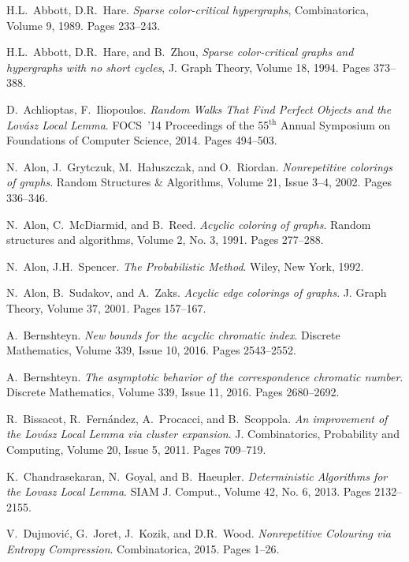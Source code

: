 \documentclass[10pt]{article}
\numberwithin{equation}{subsection}
\theoremstyle{definition}
\begin{document}
	\begin{thebibliography}{99}\setlength{\itemsep}{-0.001mm}
		
		 H.L.~Abbott, D.R.~Hare. \emph{Sparse color-critical hypergraphs}, Combinatorica, Volume 9, 1989. Pages 233--243.
		
		 H.L.~Abbott, D.R.~Hare, and B.~Zhou, \emph{Sparse color-critical graphs and hypergraphs
		with no short cycles}, J. Graph Theory, Volume 18, 1994. Pages 373--388.
		
		 D.~Achlioptas, F.~Iliopoulos. \emph{Random Walks That Find Perfect Objects and the Lov\'{a}sz Local Lemma}. FOCS~'14 Proceedings of the 55$^\text{th}$ Annual Symposium on Foundations of Computer Science, 2014. Pages 494--503.
		
		 N.~Alon, J.~Grytczuk, M.~Ha\l{}uszczak, and O.~Riordan. \emph{Nonrepetitive colorings of graphs}. Random Structures \& Algorithms, Volume 21, Issue 3--4, 2002. Pages 336--346.
		
		 N.~Alon, C.~McDiarmid, and B.~Reed. \emph{Acyclic coloring of graphs}. Random structures and algorithms, Volume 2, No. 3, 1991. Pages 277--288.
		
		 N.~Alon, J.H.~Spencer. \emph{The Probabilistic Method}. Wiley, New York, 1992.
		
		  N.~Alon, B.~Sudakov, and A.~Zaks. \emph{Acyclic edge colorings of graphs}. J. Graph Theory, Volume 37, 2001. Pages 157--167.
		
		 A.~Bernshteyn. \emph{New bounds for the acyclic chromatic index}. Discrete Mathematics, Volume 339, Issue 10, 2016. Pages 2543--2552.
		
		 A.~Bernshteyn. \emph{The asymptotic behavior of the correspondence chromatic number}. Discrete Mathematics, Volume 339, Issue 11, 2016. Pages 2680--2692.
		
		 R.~Bissacot, R.~Fern\'{a}ndez, A.~Procacci, and B.~Scoppola. \emph{An improvement of the Lov\'{a}sz Local Lemma via cluster expansion}. J. Combinatorics, Probability and Computing, Volume 20, Issue 5, 2011. Pages 709--719.
		
		 K.~Chandrasekaran, N.~Goyal, and B.~Haeupler. \emph{Deterministic Algorithms for the Lovasz Local Lemma}. SIAM J. Comput., Volume 42, No. 6, 2013. Pages 2132--2155.
		
		 V.~Dujmovi\'{c}, G.~Joret, J.~Kozik, and D.R.~Wood. \emph{Nonrepetitive Colouring via Entropy Compression}. Combinatorica, 2015. Pages 1--26.
		

\end{thebibliography}
\end{document}
